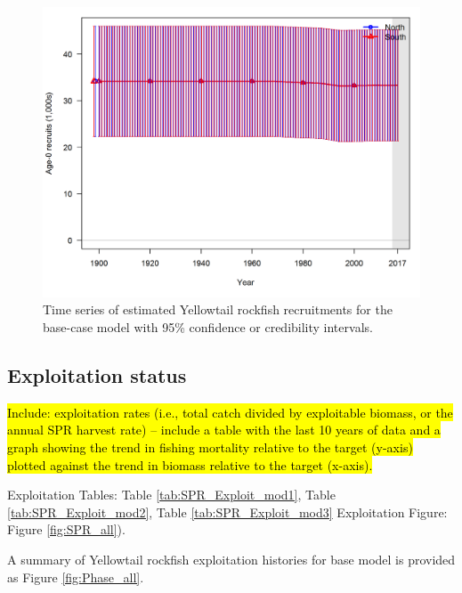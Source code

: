 \documentclass[12pt,]{article}
\begin{document}
\FloatBarrier

\begin{figure}[htbp]
\centering
\includegraphics{r4ss/plots_compare/base_compare8_recruits_uncertainty.png}
\caption{Time series of estimated Yellowtail rockfish recruitments for
the base-case model with 95\% confidence or credibility intervals.
\label{fig:Recruits_all}}
\end{figure}

\FloatBarrier

\subsection*{Exploitation status}\label{exploitation-status}

\hl{Include: exploitation rates (i.e., total catch divided by exploitable biomass, or the annual SPR harvest rate) – include a table with the last 10 years of data and a graph showing the trend in fishing mortality relative to the target (y-axis) plotted against the trend in biomass relative to the target (x-axis).}

Exploitation Tables: Table \ref{tab:SPR_Exploit_mod1}, Table
\ref{tab:SPR_Exploit_mod2}, Table \ref{tab:SPR_Exploit_mod3}
Exploitation Figure: Figure \ref{fig:SPR_all}).

A summary of Yellowtail rockfish exploitation histories for base model
is provided as Figure \ref{fig:Phase_all}.

\FloatBarrier
\end{document}
